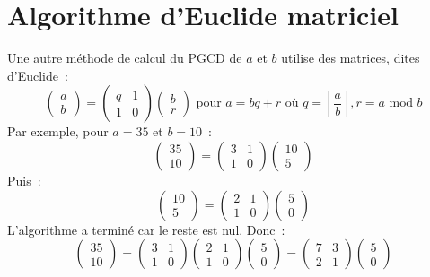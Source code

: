 \documentclass[11pt]{article}
\begin{document}
{
\section{Algorithme d'Euclide matriciel}
Une autre méthode  de calcul du PGCD de $a$ et $b$ utilise des matrices, dites d'Euclide~:
$$
\left( \begin{array}{c} a \\
b\end{array}\right) = \left( \begin{array}{cc} q & 1\\
1 & 0 \end{array}\right) \left( \begin{array}{c} b\\
r \end{array}\right) \mbox{ pour } a = bq + r \mbox{ où }  q=\left\lfloor \frac{a}{b}\right\rfloor, r = a \mbox{ mod } b$$
Par exemple, pour $a=35$ et $b=10$~:
$$
\left( \begin{array}{c} 35 \\
10 \end{array}\right) = \left( \begin{array}{cc} 3 & 1 \\
1 & 0 \end{array}\right) \left( \begin{array}{c} 10\\
5 \end{array}\right)$$
Puis~:
$$
\left( \begin{array}{c} 10 \\
5  \end{array}\right) = \left( \begin{array}{cc} 2 & 1\\
1 & 0 \end{array}\right) \left( \begin{array}{c} 5 \\
0 \end{array}\right)$$
L'algorithme a terminé car le reste est nul.
Donc~:  
$$
\left( \begin{array}{c} 35 \\
10 \end{array}\right) = \left( \begin{array}{cc} 3 & 1 \\
1 & 0 \end{array}\right) \left( \begin{array}{cc} 2 & 1\\
1 & 0 \end{array}\right) \left( \begin{array}{c} 5 \\
0 \end{array}\right)= \left( \begin{array}{cc} 7 & 3\\
2 & 1 \end{array}\right) \left( \begin{array}{c} 5 \\
0 \end{array}\right)$$

}
\end{document}
